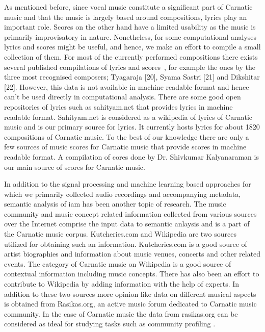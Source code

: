 As mentioned before, since vocal music constitute a significant part of Carnatic music and that the music is largely based around compositions, lyrics play an important role. Scores on the other hand have a limited usability as the music is primarily improvisatory in nature. Nonetheless, for some computational analyses lyrics and scores might be useful, and hence, we make an effort to compile a small collection of them. For most of the currently performed compositions there exists several published compilations of lyrics and scores~, for example the ones by the three most recognised
composers; Tyagaraja [20], Syama Sastri [21] and Dikshitar
[22]. However, this data is not available in machine readable format and hence can't be used directly in computational analysis. There are some good open repositories of lyrics such as sahityam.net that provides lyrics in machine readable format. Sahityam.net is considered as a wikipedia of lyrics of Carnatic music and is our primary source for lyrics. It currently hosts lyrics for about 1820 compositions of Carnatic music. To the best of our knowledge there are only a few sources of music scores for Carnatic music that provide scores in machine readable format. A compilation of cores done by Dr. Shivkumar Kalyanaraman is our main source of scores for Carnatic music.

In addition to the signal processing and machine learning based approaches for which we primarily collected audio recordings and accompanying metadata, semantic analysis of \gls{iam} has been another topic of research. The music community and music concept related information collected from various sources over the Internet comprise the input data to semantic anlaysis and is a part of the Carnatic music corpus. Kutcheries.com and Wikipedia are two sources utilized for obtaining such an information. Kutcheries.com is a good source of artist biographies and information about music venues, concerts and other related events. The category of Carnatic music on Wikipedia is a good source of contextual information including music concepts. There has also been an effort to contribute to Wikipedia by adding information with the help of experts. In addition to these two sources more opinion like data on different musical aspects is obtained from Rasikas.org, an active music forum dedicated to Carnatic music community. In the case of Carnatic music the data from rasikas.org can be considered as ideal for studying tasks such as community profiling .


